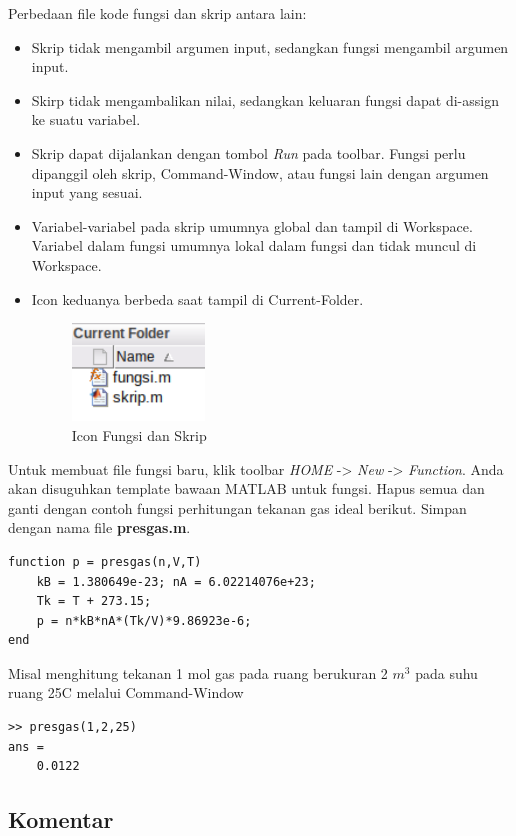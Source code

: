 \documentclass[12pt]{book}
\begin{document}
	Perbedaan file kode fungsi dan skrip antara lain:
	\begin{itemize}
		\item Skrip tidak mengambil argumen input, sedangkan fungsi mengambil argumen input.
		\item Skirp tidak mengambalikan nilai, sedangkan keluaran fungsi dapat di-assign ke suatu variabel.
		\item Skrip dapat dijalankan dengan tombol \textit{Run} pada toolbar.
		Fungsi perlu dipanggil oleh skrip, Command-Window, atau fungsi lain dengan argumen input yang sesuai.
		\item Variabel-variabel pada skrip umumnya global dan tampil di Workspace.
		 Variabel dalam fungsi umumnya lokal dalam fungsi dan tidak muncul di Workspace.
		\item Icon keduanya berbeda saat tampil di Current-Folder.
		\begin{figure}[!ht]
			\centering
			\includegraphics[width=100pt]{images/iconfile}
			\caption{Icon Fungsi dan Skrip}
		\end{figure}
	\end{itemize}

	Untuk membuat file fungsi baru, klik toolbar \textit{HOME} -> \textit{New} -> \textit{Function}.
	Anda akan disuguhkan template bawaan MATLAB untuk fungsi.
	Hapus semua dan ganti dengan contoh fungsi perhitungan tekanan gas ideal berikut.
	Simpan dengan nama file \textbf{presgas.m}.

	\begin{verbatim}
function p = presgas(n,V,T)
	kB = 1.380649e-23; nA = 6.02214076e+23;
	Tk = T + 273.15;
	p = n*kB*nA*(Tk/V)*9.86923e-6;
end
	\end{verbatim}

	Misal menghitung tekanan 1 mol gas pada ruang berukuran 2 $m^3$ pada suhu ruang 25\textdegree C melalui Command-Window
	\begin{verbatim}
>> presgas(1,2,25)
ans =
    0.0122
	\end{verbatim}

	\subsection{Komentar}
\end{document}
